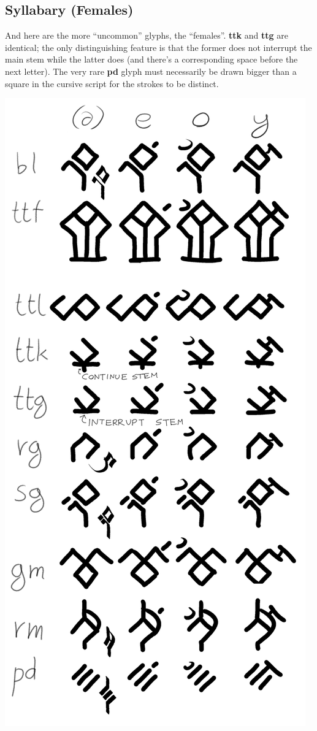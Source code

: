 \documentclass[10pt,oneside]{memoir}
\begin{document}
\begin{samepage}

\section{Syllabary (Females)}
    And here are the more ``uncommon'' glyphs, the ``females''. \textbf{ttk} and \textbf{ttg} are identical; the only distinguishing feature is that the former does not interrupt the main stem while the latter does (and there's a corresponding space before the next letter). The very rare \textbf{pd} glyph must necessarily be drawn bigger than a square in the cursive script for the strokes to be distinct.
\
\begin{center}
    \includegraphics[scale=0.60]{syllabary_females_small}
\end{center}

\end{samepage}
\end{document}
